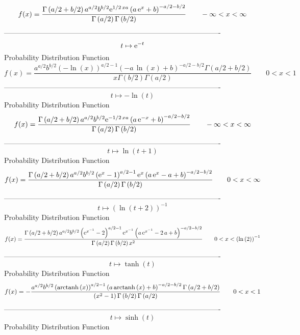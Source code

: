 \documentclass[12pt]{article}
\begin{document}
$$  f(x)={\frac {\Gamma \left( a/2+b/2 \right) {a}^{a/2}{b}^{b/2}{{\rm e}^{1/2
\,xa}} \left( a\,{{\rm e}^{x}}+b \right) ^{-a/2-b/2}}{\Gamma \left( a/
2 \right) \Gamma \left( b/2 \right) }}
 \qquad-\infty 
 < x < \infty 
$$-------------------------------------------------------------------------------------------  \\$$t\mapsto {{\rm e}^{-t}}
$$Probability Distribution Function 
$$  f(x)={\frac {{a}^{a/2}{b}^{b/2} \left( -\ln  \left( x \right)  \right) ^{a/
2-1} \left( -a\,\ln  \left( x \right) +b \right) ^{-a/2-b/2}\Gamma
 \left( a/2+b/2 \right) }{x\Gamma \left( b/2 \right) \Gamma \left( a/2
 \right) }}
 \qquad0
 < x < 1
$$-------------------------------------------------------------------------------------------  \\$$t\mapsto -\ln  \left( t \right) 
$$Probability Distribution Function 
$$  f(x)={\frac {\Gamma \left( a/2+b/2 \right) {a}^{a/2}{b}^{b/2}{{\rm e}^{-1/2
\,xa}} \left( a\,{{\rm e}^{-x}}+b \right) ^{-a/2-b/2}}{\Gamma \left( a
/2 \right) \Gamma \left( b/2 \right) }}
 \qquad-\infty 
 < x < \infty 
$$-------------------------------------------------------------------------------------------  \\$$t\mapsto \ln  \left( t+1 \right) 
$$Probability Distribution Function 
$$  f(x)={\frac {\Gamma \left( a/2+b/2 \right) {a}^{a/2}{b}^{b/2} \left( {
{\rm e}^{x}}-1 \right) ^{a/2-1}{{\rm e}^{x}} \left( a\,{{\rm e}^{x}}-a
+b \right) ^{-a/2-b/2}}{\Gamma \left( a/2 \right) \Gamma \left( b/2
 \right) }}
 \qquad0
 < x < \infty 
$$-------------------------------------------------------------------------------------------  \\$$t\mapsto  \left( \ln  \left( t+2 \right)  \right) ^{-1}
$$Probability Distribution Function 
$$  f(x)={\frac {\Gamma \left( a/2+b/2 \right) {a}^{a/2}{b}^{b/2} \left( {
{\rm e}^{{x}^{-1}}}-2 \right) ^{a/2-1}{{\rm e}^{{x}^{-1}}} \left( a\,{
{\rm e}^{{x}^{-1}}}-2\,a+b \right) ^{-a/2-b/2}}{\Gamma \left( a/2
 \right) \Gamma \left( b/2 \right) {x}^{2}}}
 \qquad0
 < x <  \left( \ln  \left( 2 \right)  \right) ^{-1}
$$-------------------------------------------------------------------------------------------  \\$$t\mapsto \tanh \left( t \right) 
$$Probability Distribution Function 
$$  f(x)=-{\frac {{a}^{a/2}{b}^{b/2} \left( {\rm arctanh} \left(x\right)
 \right) ^{a/2-1} \left( a\,{\rm arctanh} \left(x\right)+b \right) ^{-
a/2-b/2}\Gamma \left( a/2+b/2 \right) }{ \left( {x}^{2}-1 \right) 
\Gamma \left( b/2 \right) \Gamma \left( a/2 \right) }}
 \qquad0
 < x < 1
$$-------------------------------------------------------------------------------------------  \\$$t\mapsto \sinh \left( t \right) 
$$Probability Distribution Function 
\end{document}
